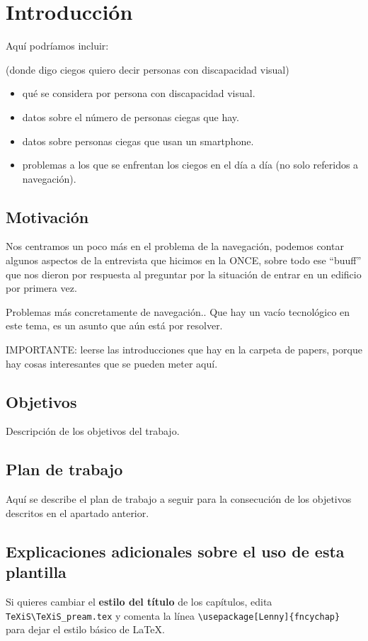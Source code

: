 \chapter{Introducción}
\label{cap:introduccion}


Aquí podríamos incluir:

(donde digo ciegos quiero decir personas con discapacidad visual)
\begin{itemize}

	\item qué se considera por persona con discapacidad visual.
	\item datos sobre el número de personas ciegas que hay.
	\item datos sobre personas ciegas que usan un smartphone.
	\item problemas a los que se enfrentan los ciegos en el día a día (no solo referidos a navegación).
	
\end{itemize}


\section{Motivación}
Nos centramos un poco más en el problema de la navegación, podemos contar algunos aspectos de la entrevista que hicimos en la ONCE, sobre todo ese ``buuff'' que nos dieron por respuesta al preguntar por la situación de entrar en un edificio por primera vez.

Problemas más concretamente de navegación..
Que hay un vacío tecnológico en este tema, es un asunto que aún está por resolver.

IMPORTANTE: leerse las introducciones que hay en la carpeta de papers, porque hay cosas interesantes que se pueden meter aquí.
\section{Objetivos}
Descripción de los objetivos del trabajo.


\section{Plan de trabajo}
Aquí se describe el plan de trabajo a seguir para la consecución de los objetivos descritos en el apartado anterior.



\section{Explicaciones adicionales sobre el uso de esta plantilla}
Si quieres cambiar el \textbf{estilo del título} de los capítulos, edita \verb|TeXiS\TeXiS_pream.tex| y comenta la línea \verb|\usepackage[Lenny]{fncychap}| para dejar el estilo básico de \LaTeX.

